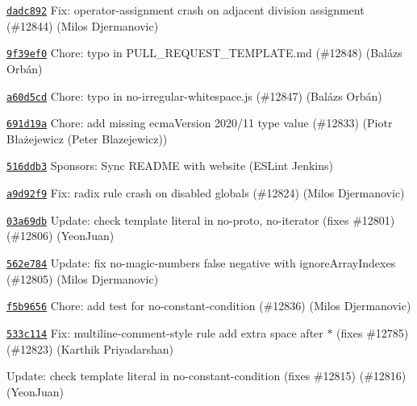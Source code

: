 \begin{DoxyItemize}
\item \href{https://github.com/eslint/eslint/commit/dadc8927820576c60b48bcbc7d5a9056a6279d30}{\texttt{ {\ttfamily dadc892}}} Fix\+: operator-\/assignment crash on adjacent division assignment (\#12844) (Milos Djermanovic)
\item \href{https://github.com/eslint/eslint/commit/9f39ef0d4b398c7c09ceef89128da448680d587c}{\texttt{ {\ttfamily 9f39ef0}}} Chore\+: typo in PULL\+\_\+\+REQUEST\+\_\+\+TEMPLATE.\+md (\#12848) (Balázs Orbán)
\item \href{https://github.com/eslint/eslint/commit/a60d5cd2325ca72fa1b272b0b90ccd7904b92062}{\texttt{ {\ttfamily a60d5cd}}} Chore\+: typo in no-\/irregular-\/whitespace.\+js (\#12847) (Balázs Orbán)
\item \href{https://github.com/eslint/eslint/commit/691d19a2872bffab50c0024d488b8cb33504cc83}{\texttt{ {\ttfamily 691d19a}}} Chore\+: add missing {\ttfamily ecma\+Version} 2020/11 type value (\#12833) (Piotr Błażejewicz (Peter Blazejewicz))
\item \href{https://github.com/eslint/eslint/commit/516ddb37d39502e5a8c88a017ae3bad05046f41d}{\texttt{ {\ttfamily 516ddb3}}} Sponsors\+: Sync README with website (ESLint Jenkins)
\item \href{https://github.com/eslint/eslint/commit/a9d92f991d69902a9150db373590e2ed54dec988}{\texttt{ {\ttfamily a9d92f9}}} Fix\+: radix rule crash on disabled globals (\#12824) (Milos Djermanovic)
\item \href{https://github.com/eslint/eslint/commit/03a69dbe86d5b5768a310105416ae726822e3c1c}{\texttt{ {\ttfamily 03a69db}}} Update\+: check template literal in no-\/proto, no-\/iterator (fixes \#12801) (\#12806) (Yeon\+Juan)
\item \href{https://github.com/eslint/eslint/commit/562e7845946a490f2e173a0bcd1af631070a4eef}{\texttt{ {\ttfamily 562e784}}} Update\+: fix no-\/magic-\/numbers false negative with ignore\+Array\+Indexes (\#12805) (Milos Djermanovic)
\item \href{https://github.com/eslint/eslint/commit/f5b96564f732962f46755adbb33c49fae9af6a92}{\texttt{ {\ttfamily f5b9656}}} Chore\+: add test for no-\/constant-\/condition (\#12836) (Milos Djermanovic)
\item \href{https://github.com/eslint/eslint/commit/533c1140dc98bebdc3ae8334ab2e6c27c7df0c21}{\texttt{ {\ttfamily 533c114}}} Fix\+: multiline-\/comment-\/style rule add extra space after \texorpdfstring{$\ast$}{*} (fixes \#12785) (\#12823) (Karthik Priyadarshan)
\item \href{https://github.com/eslint/eslint/commit/0460748cda67ddc4a4cb0db3cdf187a742d09bf8}{\texttt{ {}}} Update\+: check template literal in no-\/constant-\/condition (fixes \#12815) (\#12816) (Yeon\+Juan)

\end{DoxyItemize}
